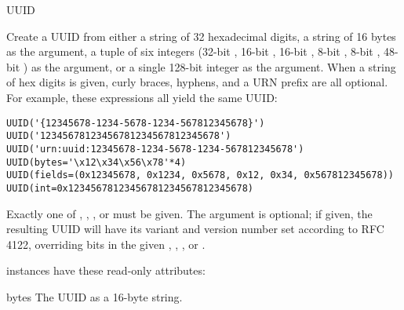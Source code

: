 \begin{classdesc}{UUID}{}


Create a UUID from either a string of 32 hexadecimal digits,
a string of 16 bytes as the  argument, a tuple of six
integers (32-bit , 16-bit ,
16-bit ,
8-bit , 8-bit , 48-bit )
as the  argument, or a single 128-bit integer as the 
argument.  When a string of hex digits is given, curly braces,
hyphens, and a URN prefix are all optional.  For example, these
expressions all yield the same UUID:

\begin{verbatim}
UUID('{12345678-1234-5678-1234-567812345678}')
UUID('12345678123456781234567812345678')
UUID('urn:uuid:12345678-1234-5678-1234-567812345678')
UUID(bytes='\x12\x34\x56\x78'*4)
UUID(fields=(0x12345678, 0x1234, 0x5678, 0x12, 0x34, 0x567812345678))
UUID(int=0x12345678123456781234567812345678)
\end{verbatim}

Exactly one of , , , or  must
be given.  The  argument is optional; if given, the
resulting UUID will have its variant and version number set according to
RFC 4122, overriding bits in the given , ,
, or .

\end{classdesc}

 instances have these read-only attributes:

\begin{memberdesc}{bytes}
The UUID as a 16-byte string.
\end{memberdesc}

